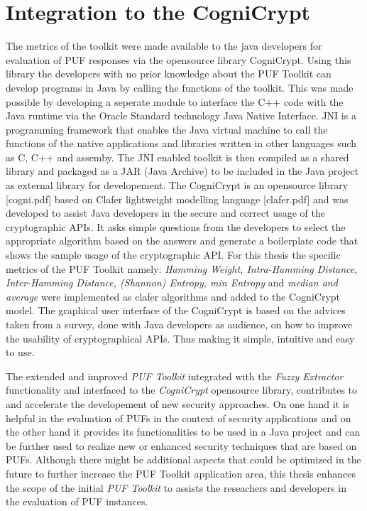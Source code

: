 \section{Integration to the CogniCrypt}
The metrics of the toolkit were made available to the java developers for evaluation of PUF responses via the opensource library CogniCrypt. Using this library the developers with no prior knowledge about the PUF Toolkit can develop programs in Java by calling the functions of the toolkit. This was made possible by developing a seperate module to interface the C++ code with the Java runtime via the Oracle Standard technology Java Native Interface. JNI is a programming
framework that enables the Java virtual machine to call the functions of the native applications and libraries written in other languages such as C, C++ and assemby. The JNI enabled toolkit is then compiled as a shared library and packaged as a JAR (Java Archive) to be included in the Java project as external library for developement. The CogniCrypt is an opensource library [cogni.pdf] based on Clafer lightweight modelling language [clafer.pdf] and was developed to assist Java developers in the secure and correct usage of the cryptographic APIs. It asks
simple questions from the developers to select the appropriate algorithm based on the answers and generate a boilerplate code that shows the sample usage of the cryptographic API. For this thesis the specific metrics of the PUF Toolkit namely: \emph{Hamming Weight, Intra-Hamming Distance, Inter-Hamming Distance, (Shannon) Entropy, min Entropy} and \emph{median and average} were implemented as clafer algorithms and added to the CogniCrypt model. The graphical user interface of the
CogniCrypt is based on the advices taken from a survey, done with Java developers as audience, on how to improve the usability of cryptographical APIs. Thus making it simple, intuitive and easy to use.

The extended and improved \emph{PUF Toolkit} integrated with the \emph{Fuzzy Extractor} functionality and interfaced to the \emph{CogniCrypt} opensource library, contributes to and accelerate the developement of new security approaches. On one hand it is helpful in the evaluation of PUFs in the context of security applications and on the other hand it provides its functionalities to be used in a Java project and can be further used to realize new or enhanced security techniques that
are based on PUFs. Although there might be additional aspects that could be optimized in the future to further increase the PUF Toolkit application area, this thesis enhances the scope of the initial \emph{PUF Toolkit} to assists the reseachers and developers in the evaluation of PUF instances.

